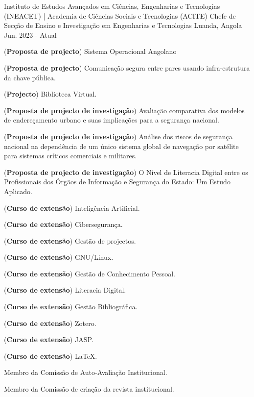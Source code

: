 \begin{cventries}
\cventry
{Instituto de Estudos Avançados em Ciências, Engenharias e Tecnologias (INEACET) | Academia de Ciências Sociais e Tecnologias (ACITE)} %
{Chefe de Secção de Ensino e Investigação em Engenharias e Tecnologias} %
{Luanda, Angola} %
{Jun. 2023 - Atual} %
{ %
\begin{cvitems}
    \item (\textbf{Proposta de projecto}) Sistema Operacional Angolano
    \item (\textbf{Proposta de projecto}) Comunicação segura entre pares usando infra-estrutura da chave pública.
    \item (\textbf{Projecto}) Biblioteca Virtual.
    \item (\textbf{Proposta de projecto de investigação}) Avaliação comparativa dos modelos de endereçamento urbano e suas implicações para a segurança nacional.
    \item (\textbf{Proposta de projecto de investigação}) Análise dos riscos de segurança nacional na dependência de um único sistema global de navegação por satélite para sistemas críticos comerciais e militares.
    \item (\textbf{Proposta de projecto de investigação}) O Nível de Literacia Digital entre os Profissionais dos Órgãos de Informação e Segurança do Estado: Um Estudo Aplicado.
    \item (\textbf{Curso de extensão}) Inteligência Artificial.
    \item (\textbf{Curso de extensão}) Cibersegurança.
    \item (\textbf{Curso de extensão}) Gestão de projectos.
    \item (\textbf{Curso de extensão}) GNU/Linux.
    \item (\textbf{Curso de extensão}) Gestão de Conhecimento Pessoal.
    \item (\textbf{Curso de extensão}) Literacia Digital.
    \item (\textbf{Curso de extensão}) Gestão Bibliográfica.
    \item (\textbf{Curso de extensão}) Zotero.
    \item (\textbf{Curso de extensão}) JASP.
    \item (\textbf{Curso de extensão}) \LaTeX.
    \item Membro da Comissão de Auto-Avaliação Institucional.
    \item Membro da Comissão de criação da revista institucional.
\end{cvitems}
}


\end{cventries}
